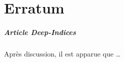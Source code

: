 \documentclass[../thesis.tex]{subfiles}
\begin{document}
    
    \chapter*{Erratum}
    
    \paragraph{Article Deep-Indices}
    Après discussion, il est apparue que \dots
    
\end{document}
